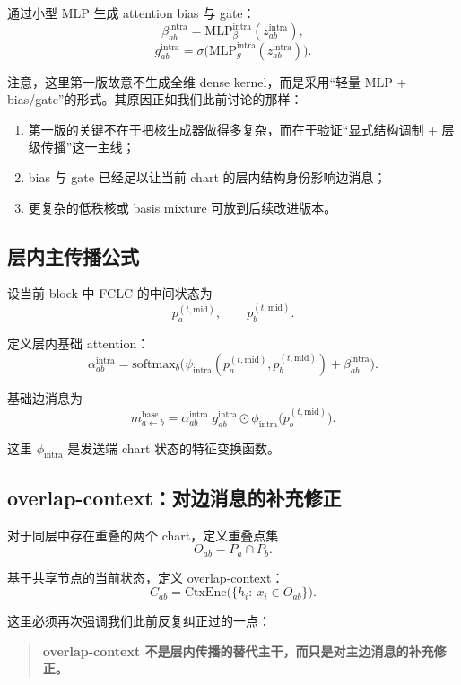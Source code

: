 \documentclass[12pt,a4paper]{ctexart}
\begin{document}
通过小型 MLP 生成 attention bias 与 gate：
\[
\beta_{ab}^{\mathrm{intra}}
=
\mathrm{MLP}_{\beta}^{\mathrm{intra}}(z_{ab}^{\mathrm{intra}}),
\]
\[
g_{ab}^{\mathrm{intra}}
=
\sigma\Big(
\mathrm{MLP}_{g}^{\mathrm{intra}}(z_{ab}^{\mathrm{intra}})
\Big).
\]

注意，这里第一版故意不生成全维 dense kernel，而是采用“轻量 MLP + bias/gate”的形式。其原因正如我们此前讨论的那样：

\begin{enumerate}[leftmargin=2em]
    \item 第一版的关键不在于把核生成器做得多复杂，而在于验证“显式结构调制 + 层级传播”这一主线；
    \item bias 与 gate 已经足以让当前 chart 的层内结构身份影响边消息；
    \item 更复杂的低秩核或 basis mixture 可放到后续改进版本。
\end{enumerate}

\subsection{层内主传播公式}

设当前 block 中 FCLC 的中间状态为
\[
p_a^{(t,\mathrm{mid})},
\qquad
p_b^{(t,\mathrm{mid})}.
\]

定义层内基础 attention：
\[
\alpha_{ab}^{\mathrm{intra}}
=
\mathrm{softmax}_{b}
\Big(
\psi_{\mathrm{intra}}(
p_a^{(t,\mathrm{mid})},
p_b^{(t,\mathrm{mid})}
)
+
\beta_{ab}^{\mathrm{intra}}
\Big).
\]

基础边消息为
\[
m_{a\leftarrow b}^{\mathrm{base}}
=
\alpha_{ab}^{\mathrm{intra}}
\;
g_{ab}^{\mathrm{intra}}
\odot
\phi_{\mathrm{intra}}
\big(
p_b^{(t,\mathrm{mid})}
\big).
\]

这里 \(\phi_{\mathrm{intra}}\) 是发送端 chart 状态的特征变换函数。

\subsection{overlap-context：对边消息的补充修正}

对于同层中存在重叠的两个 chart，定义重叠点集
\[
O_{ab}=P_a\cap P_b.
\]

基于共享节点的当前状态，定义 overlap-context：
\[
C_{ab}
=
\mathrm{CtxEnc}
\big(
\{h_i:\ x_i\in O_{ab}\}
\big).
\]

这里必须再次强调我们此前反复纠正过的一点：

\begin{quote}
\textbf{overlap-context 不是层内传播的替代主干，而只是对主边消息的补充修正。}
\end{quote}
\end{document}
